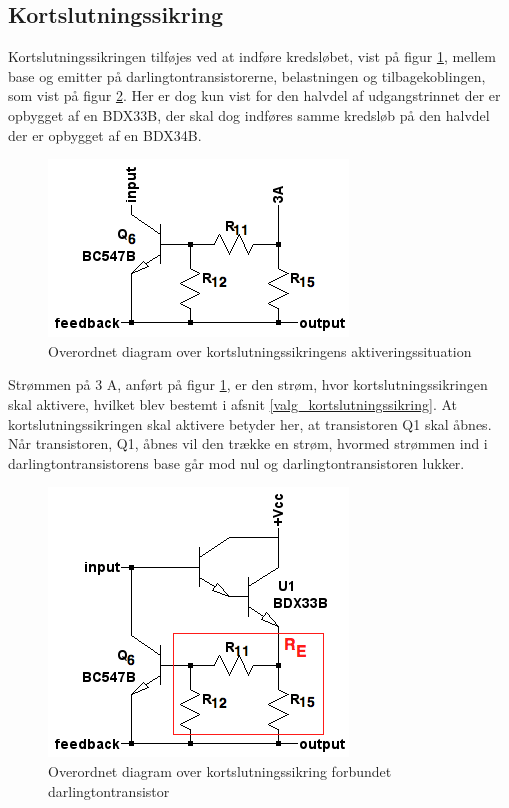 \subsection{Kortslutningssikring}
\label{effekt_kortslutningssikring}
Kortslutningssikringen tilføjes ved at indføre kredsløbet, vist på figur \ref{fig:dia-kortslut}, mellem base og emitter på darlingtontransistorerne, belastningen og tilbagekoblingen, som vist på figur \ref{fig:dia-kortslut1}. Her er dog kun vist for den halvdel af udgangstrinnet der er opbygget af en BDX33B, der skal dog indføres samme kredsløb på den halvdel der er opbygget af en BDX34B. 

\begin{figure}[h]
\centering
\includegraphics[scale=0.5]{teknisk/effektforstaerker/diagram-kortslut.png}
\caption{Overordnet diagram over kortslutningssikringens aktiveringssituation}
\label{fig:dia-kortslut}
\end{figure}

Strømmen på 3 A, anført på figur \ref{fig:dia-kortslut}, er den strøm, hvor kortslutningssikringen skal aktivere, hvilket blev bestemt i afsnit \ref{valg_kortslutningssikring}. At kortslutningssikringen skal aktivere betyder her, at transistoren Q1 skal åbnes. Når transistoren, Q1, åbnes vil den trække en strøm, hvormed strømmen ind i darlingtontransistorens base går mod nul og darlingtontransistoren lukker. 


\begin{figure}[h]
\centering
\includegraphics[scale=0.5]{teknisk/effektforstaerker/diagram-kortslut1.png}
\caption{Overordnet diagram over kortslutningssikring forbundet darlingtontransistor}
\label{fig:dia-kortslut1}
\end{figure}

